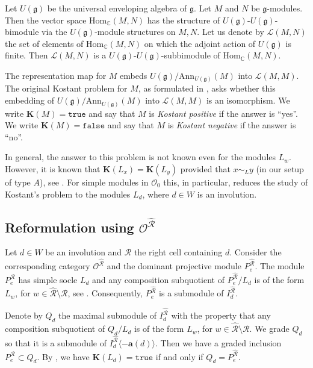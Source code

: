\documentclass[a4paper]{amsart}
\begin{document}
Let $U(\mathfrak{g})$ be the universal enveloping algebra of 
$\mathfrak{g}$. Let $M$ and $N$ be $\mathfrak{g}$-modules. Then
the vector space $\mathrm{Hom}_\mathbb{C}(M,N)$ has the
structure of $U(\mathfrak{g})$-$U(\mathfrak{g})$-bimodule via the $U(\mathfrak{g})$-module structures on $M,N$.
Let us denote by $\mathcal{L}(M,N)$ the set of elements of 
$\mathrm{Hom}_\mathbb{C}(M,N)$ on which the adjoint action of 
$U(\mathfrak{g})$ is finite. Then
$\mathcal{L}(M,N)$ is a 
$U(\mathfrak{g})$-$U(\mathfrak{g})$-subbimodule
of $\mathrm{Hom}_\mathbb{C}(M,N)$.

The representation map for $M$
embeds $U(\mathfrak{g})/\mathrm{Ann}_{U(\mathfrak{g})}(M)$ into 
$\mathcal{L}(M,M)$. The original Kostant problem
for $M$, as formulated in \cite{Jo}, asks whether this 
embedding of $U(\mathfrak{g})/\mathrm{Ann}_{U(\mathfrak{g})}(M)$ into 
$\mathcal{L}(M,M)$ is an isomorphism.
We write $\mathbf{K}(M)=\mathtt{true}$ 
and say that $M$ is {\em Kostant positive} if the answer is ``yes''.
We write $\mathbf{K}(M)=\mathtt{false}$ 
and say that $M$ is {\em Kostant negative} if the answer is ``no''.

In general, the answer to this problem is not known even for
the modules $L_w$. However, it is known that 
$\mathbf{K}(L_x)=\mathbf{K}(L_y)$ provided that 
$x\sim_L y$ (in our setup of type $A$), see \cite{MS}.
For simple modules in $\mathcal{O}_0$ this, in particular,
reduces the study of Kostant's problem to the modules $L_d$, where 
$d\in W$ is an involution.

\subsection{Reformulation using $\mathcal{O}^{\hat{\mathcal{R}}}$}\label{s3.2}

Let  $d\in W$ be an involution and $\mathcal{R}$ the right cell 
containing $d$. Consider the corresponding category 
$\mathcal{O}^{\hat{\mathcal{R}}}$ and the dominant projective
module $P^{\hat{\mathcal{R}}}_e$. The module 
$P^{\hat{\mathcal{R}}}_e$ has simple socle $L_d$
and any composition subquotient of 
$P^{\hat{\mathcal{R}}}_e/L_d$ is of the form
$L_w$, for $w\in \hat{\mathcal{R}}\setminus \mathcal{R}$,
see \cite{Ma2}. Consequently, $P^{\hat{\mathcal{R}}}_e$
is a submodule of $I^{\hat{\mathcal{R}}}_d$.

Denote by $Q_d$ the maximal submodule of 
$I^{\hat{\mathcal{R}}}_d$
with the property that any composition subquotient of 
$Q_d/L_d$ is of the form
$L_w$, for $w\in \hat{\mathcal{R}}\setminus \mathcal{R}$.
We grade $Q_d$ so that it is a submodule of $I^{\hat{\mathcal{R}}}_d \langle -\mathbf{a}(d)\rangle$.
Then we have a graded inclusion $P^{\hat{\mathcal{R}}}_e\subset Q_d$.
By \cite{KhM}, we have $\mathbf{K}(L_d)=\mathtt{true}$
if and only if $Q_d= P^{\hat{\mathcal{R}}}_e$.
\end{document}
